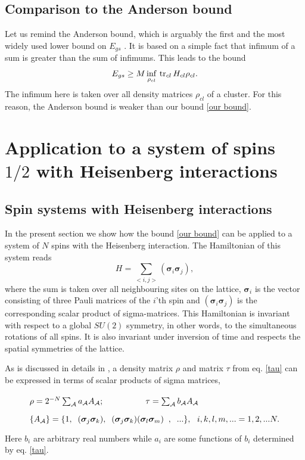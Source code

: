 \documentclass[a4paper]{jpconf}
\renewcommand\[{\begin{equation}}
\renewcommand\]{\end{equation}}
\newcommand{\ssigma}{{\bm \sigma}}
\newcommand{\be}{\begin{equation}}
\newcommand{\ee}{\end{equation}}
\newcommand{\A}{{\cal A}}
\begin{document}
\subsection{Comparison to the Anderson bound}

Let us remind the Anderson bound, which is arguably the first and the most widely used lower bound on $E_{gs}$ \cite{Anderson}. It is based on a simple fact that infimum of a sum is greater than the sum of infimums. This leads to the bound
\be
E_{gs} \geq
M \inf\limits_{ \rho_{cl} } \, \tr_{cl}  H_{cl} \rho_{cl}.
\ee
The infimum here is taken over all density matrices $\rho_{cl}$ of a cluster. For this reason, the Anderson bound is weaker than our bound \eqref{our bound}.

\section{Application to a system of spins $1/2$ with Heisenberg interactions}

\subsection{Spin systems with Heisenberg interactions}

In the present section we show how the bound \eqref{our bound} can be applied to  a system of $N$ spins with the Heisenberg interaction. The Hamiltonian of this system reads
%
\begin{equation}\label{H Heisenberg}
	H = \sum_{<i,j>} \left( {{{\bm \ssigma}_i}{{\bm \ssigma}_j}} \right) ,
\end{equation}
where  the sum is taken over all neighbouring sites on the lattice, ${\bm \ssigma}_i$ is the vector consisting of three Pauli matrices of the $i$'th spin and $\left( {{{\bm \ssigma}_i}{{\bm \ssigma}_j}} \right)$ is the corresponding scalar product of sigma-matrices. This Hamiltonian is invariant with respect to a global $SU(2)$ symmetry, in other words, to the simultaneous rotations of all spins. It is also invariant under inversion of time and respects the spatial symmetries of the lattice. 

As is discussed in details in \cite{SqParam,Shpagina}, a density matrix $\rho$ and matrix $\tau$ from eq. \eqref{tau} can be expressed in terms of scalar products of sigma matrices,
\[
\def\arraystretch{1.8}
\begin{array}{l}
\rho  = 2^{-N} \sum_\A a_\A A_\A;\qquad \qquad \tau  = \sum_\A b_\A A_\A
\\
\{ A_\A \}  = \{ 1,  \;\;({\bf \ssigma}_j{\bf\ssigma}_k), \;\;
({\bf \ssigma}_j{\bf\ssigma}_k)({\bf \ssigma}_l{\bf\ssigma}_m)\;\;,\;\;...\},~~i,k,l,m,...=1,2,...N.
\end{array}\]
Here $b_i$ are arbitrary real numbers while $a_i$ are some functions of $b_i$ determined by eq. \eqref{tau}.
\end{document}
